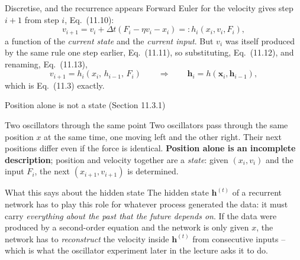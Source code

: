 \documentclass[10pt,aspectratio=169]{beamer}
\begin{document}
\begin{frame}{Discretise, and the recurrence appears}
Forward Euler for the velocity gives step $i+1$ from step $i$, Eq.~(11.10):
\[
  v_{i+1}=v_i+\Delta t\left(F_i-\eta v_i-x_i\right)=:h_i\!\left(x_i,v_i,F_i\right),
\]
a function of the \emph{current state} and the \emph{current input}.  But
$v_i$ was itself produced by the same rule one step earlier, Eq.~(11.11),
so substituting, Eq.~(11.12), and renaming, Eq.~(11.13),
\[
  v_{i+1}=h_i\!\left(x_i,\,h_{i-1},\,F_i\right)
  \qquad\Longrightarrow\qquad
  \bm{h}_i=h\!\left(\bm{x}_i,\bm{h}_{i-1}\right),
\]
which is Eq.~(11.3) exactly.
\end{frame}

\begin{frame}{Position alone is not a state (Section 11.3.1)}
\begin{block}{Two oscillators through the same point}
Two oscillators pass through the same position $x$ at the same time, one
moving left and the other right.  Their next positions differ even if the
force is identical.  \textbf{Position alone is an incomplete description};
position and velocity together are a \emph{state}: given $(x_i,v_i)$ and
the input $F_i$, the next $(x_{i+1},v_{i+1})$ is determined.
\end{block}
\begin{block}{What this says about the hidden state}
The hidden state $\bm{h}^{(t)}$ of a recurrent network has to play this role
for whatever process generated the data: it must carry \emph{everything
about the past that the future depends on}.  If the data were produced by a
second-order equation and the network is only given $x$, the network has to
\emph{reconstruct} the velocity inside $\bm{h}^{(t)}$ from consecutive
inputs -- which is what the oscillator experiment later in the lecture asks
it to do.
\end{block}
\end{frame}
\end{document}
